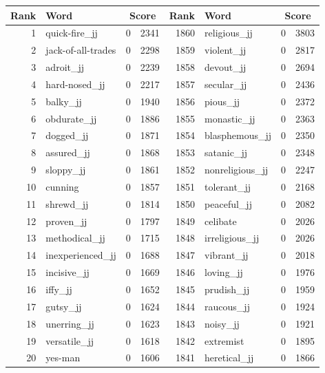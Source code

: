 \begin{table}[tbp]
    \begin{tabular}{| rlr@{.}l | rlr@{.}l |}
    \hline
    \textbf{Rank} & \textbf{Word} & \multicolumn{2}{c|}{\textbf{Score}} & \textbf{Rank} & \textbf{Word} & \multicolumn{2}{c|}{\textbf{Score}} \\
    \hline
    1 & quick-fire\_jj & 0 & 2341    &    1860 & religious\_jj & 0 & 3803 \\
    2 & jack-of-all-trades & 0 & 2298    &    1859 & violent\_jj & 0 & 2817 \\
    3 & adroit\_jj & 0 & 2239    &    1858 & devout\_jj & 0 & 2694 \\
    4 & hard-nosed\_jj & 0 & 2217    &    1857 & secular\_jj & 0 & 2436 \\
    5 & balky\_jj & 0 & 1940    &    1856 & pious\_jj & 0 & 2372 \\
    6 & obdurate\_jj & 0 & 1886    &    1855 & monastic\_jj & 0 & 2363 \\
    7 & dogged\_jj & 0 & 1871    &    1854 & blasphemous\_jj & 0 & 2350 \\
    8 & assured\_jj & 0 & 1868    &    1853 & satanic\_jj & 0 & 2348 \\
    9 & sloppy\_jj & 0 & 1861    &    1852 & nonreligious\_jj & 0 & 2247 \\
    10 & cunning & 0 & 1857    &    1851 & tolerant\_jj & 0 & 2168 \\
    11 & shrewd\_jj & 0 & 1814    &    1850 & peaceful\_jj & 0 & 2082 \\
    12 & proven\_jj & 0 & 1797    &    1849 & celibate & 0 & 2026 \\
    13 & methodical\_jj & 0 & 1715    &    1848 & irreligious\_jj & 0 & 2026 \\
    14 & inexperienced\_jj & 0 & 1688    &    1847 & vibrant\_jj & 0 & 2018 \\
    15 & incisive\_jj & 0 & 1669    &    1846 & loving\_jj & 0 & 1976 \\
    16 & iffy\_jj & 0 & 1652    &    1845 & prudish\_jj & 0 & 1959 \\
    17 & gutsy\_jj & 0 & 1624    &    1844 & raucous\_jj & 0 & 1924 \\
    18 & unerring\_jj & 0 & 1623    &    1843 & noisy\_jj & 0 & 1921 \\
    19 & versatile\_jj & 0 & 1618    &    1842 & extremist & 0 & 1895 \\
    20 & yes-man & 0 & 1606    &    1841 & heretical\_jj & 0 & 1866 \\

\end{tabular}
\end{table}
